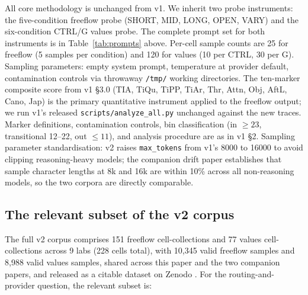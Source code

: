\documentclass[11pt,a4paper]{article}
\begin{document}
All core methodology is unchanged from v1. We inherit two probe instruments: the five-condition freeflow probe (SHORT, MID, LONG, OPEN, VARY) and the six-condition CTRL/G values probe. The complete prompt set for both instruments is in Table~\ref{tab:prompts} above. Per-cell sample counts are 25 for freeflow (5 samples per condition) and 120 for values (10 per CTRL, 30 per G). Sampling parameters: empty system prompt, temperature at provider default, contamination controls via throwaway \texttt{/tmp/} working directories. The ten-marker composite score from v1 \S3.0 (TIA, TiQu, TiPP, TiAr, Thr, Attn, Obj, AftL, Cano, Jap) is the primary quantitative instrument applied to the freeflow output; we run v1's released \texttt{scripts/analyze\_all.py} unchanged against the new traces. Marker definitions, contamination controls, bin classification (in $\geq 23$, transitional 12--22, out $\leq 11$), and analysis procedure are as in v1 \S2. Sampling parameter standardisation: v2 raises \texttt{max\_tokens} from v1's 8000 to 16000 to avoid clipping reasoning-heavy models; the companion drift paper \citep{tenner2026drift} establishes that sample character lengths at 8k and 16k are within 10\% across all non-reasoning models, so the two corpora are directly comparable.

\subsection{The relevant subset of the v2 corpus}

The full v2 corpus comprises 151 freeflow cell-collections and 77 values cell-collections across 9 labs (228 cells total), with 10{,}345 valid freeflow samples and 8{,}988 valid values samples, shared across this paper and the two companion papers, and released as a citable dataset on Zenodo \citep{tenner2026corpus}. For the routing-and-provider question, the relevant subset is:
\end{document}
